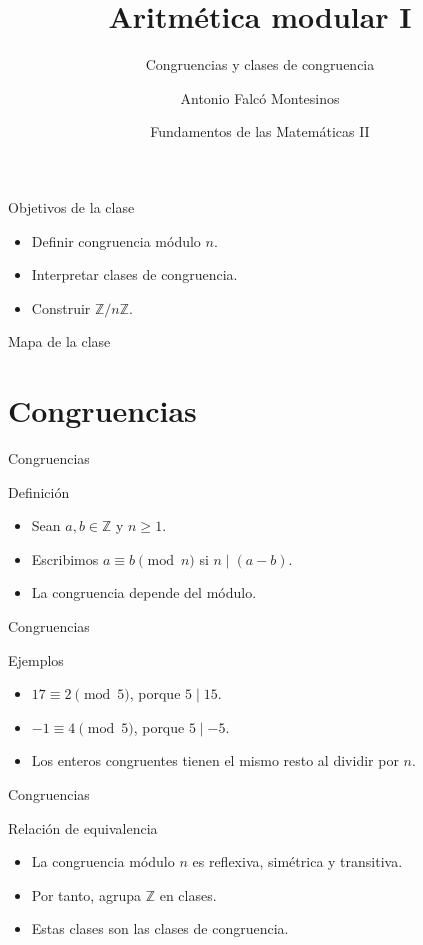 \documentclass[aspectratio=169,11pt]{beamer}
\title[FdM II -- Clase 09]{Aritmética modular I}
\subtitle{Congruencias y clases de congruencia}
\author{Antonio Falcó Montesinos}
\institute{Universidad CEU Cardenal Herrera}
\date{Fundamentos de las Matemáticas II}
\begin{document}
\begin{frame}
  \titlepage
\end{frame}

\begin{frame}{Objetivos de la clase}
\begin{itemize}
  \item Definir congruencia módulo \(n\).
  \item Interpretar clases de congruencia.
  \item Construir \(\mathbb{Z}/n\mathbb{Z}\).
\end{itemize}
\end{frame}

\begin{frame}{Mapa de la clase}
\tableofcontents
\end{frame}

\section{Congruencias}

\begin{frame}{Congruencias}
\begin{block}{Definición}
\begin{itemize}
  \item Sean \(a,b\in\mathbb{Z}\) y \(n\geq 1\).
  \item Escribimos \(a\equiv b\pmod n\) si \(n\mid(a-b)\).
  \item La congruencia depende del módulo.
\end{itemize}
\end{block}
\end{frame}

\begin{frame}{Congruencias}
\begin{block}{Ejemplos}
\begin{itemize}
  \item \(17\equiv 2\pmod 5\), porque \(5\mid 15\).
  \item \(-1\equiv 4\pmod 5\), porque \(5\mid -5\).
  \item Los enteros congruentes tienen el mismo resto al dividir por \(n\).
\end{itemize}
\end{block}
\end{frame}

\begin{frame}{Congruencias}
\begin{block}{Relación de equivalencia}
\begin{itemize}
  \item La congruencia módulo \(n\) es reflexiva, simétrica y transitiva.
  \item Por tanto, agrupa \(\mathbb{Z}\) en clases.
  \item Estas clases son las clases de congruencia.
\end{itemize}
\end{block}
\end{frame}
\end{document}
